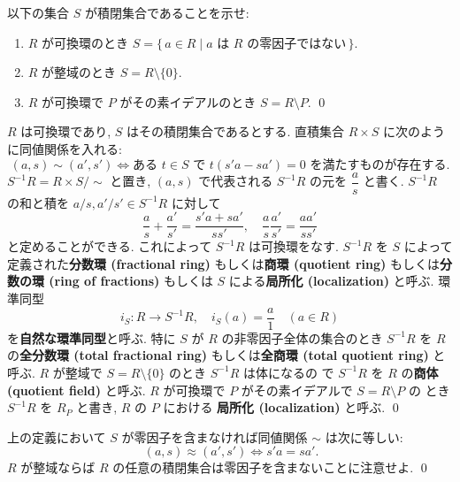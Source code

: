 \documentclass[12pt,twoside]{jarticle}
\begin{document}
\begin{question}
 以下の集合 $S$ が積閉集合であることを示せ:
 \begin{enumerate}
 \item $R$ が可換環のとき %
  $S=\{\, a\in R \mid\text{$a$ は $R$ の零因子ではない}\,\}$.
 \item $R$ が整域のとき $S=R\setminus\{0\}$. 
 \item $R$ が可換環で $P$ がその素イデアルのとき $S=R\setminus P$.
 \qed
 \end{enumerate}
\end{question}

\begin{definition}
 $R$ は可換環であり, $S$ はその積閉集合であるとする.
 直積集合 $R\times S$ に次のように同値関係を入れる:
 \begin{equation*}
  (a,s)\sim (a',s')
  \iff
  \text{ある $t\in S$ で $t(s'a-sa')=0$ を満たすものが存在する}.
 \end{equation*}
 $S^{-1}R=R\times S/{\sim}$ と置き, %
 $(a,s)$ で代表される $S^{-1}R$ の元を $\dfrac{a}{s}$ と書く.
 $S^{-1}R$ の和と積を $a/s, a'/s'\in S^{-1}R$ に対して
 \begin{equation*}
  \frac{a}{s}+\frac{a'}{s'}=
  \frac{s'a+sa'}{ss'},
  \quad
  \frac{a}{s}\frac{a'}{s'}=
  \frac{aa'}{ss'}
 \end{equation*}
 と定めることができる. これによって $S^{-1}R$ は可換環をなす.
 $S^{-1}R$ を %
 $S$ によって定義された{\bf 分数環 (fractional ring)} 
 もしくは{\bf 商環 (quotient ring)} 
 もしくは{\bf 分数の環 (ring of fractions)} 
 もしくは $S$ による{\bf 局所化 (localization)} と呼ぶ.
 環準同型 
 \begin{equation*}
  i_S:R\to S^{-1}R, \quad i_S(a)=\dfrac{a}{1} \quad (a\in R) 
 \end{equation*}
 を{\bf 自然な環準同型}と呼ぶ.
 特に $S$ が $R$ の非零因子全体の集合のとき $S^{-1}R$ 
 を $R$ の{\bf 全分数環 (total fractional ring)} 
 もしくは{\bf 全商環 (total quotient ring)} と呼ぶ.
 $R$ が整域で $S=R\setminus\{0\}$ のとき $S^{-1}R$ は体になるの
 で $S^{-1}R$ を $R$ の{\bf 商体 (quotient field)} と呼ぶ.
 $R$ が可換環で $P$ がその素イデアルで $S=R\setminus P$ の
 とき $S^{-1}R$ を $R_P$ と書き, $R$ の $P$ における
 {\bf 局所化 (localization)} と呼ぶ.
 \qed
\end{definition}

\begin{rem}
  上の定義において $S$ が零因子を含まなければ同値関係 $\sim$ は次に等しい:
 \begin{equation*}\
  (a,s)\approx (a',s') \iff s'a=sa'.
 \end{equation*}
 $R$ が整域ならば $R$ の任意の積閉集合は零因子を含まないことに注意せよ.
 \qed
\end{rem}
\end{document}

